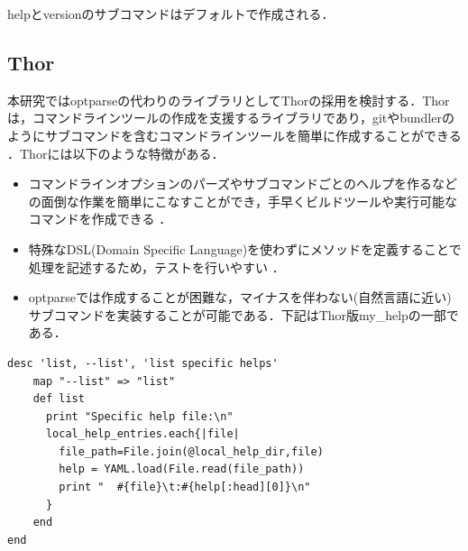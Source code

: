 helpとversionのサブコマンドはデフォルトで作成される．

\subsection{Thor}\label{thor}

本研究ではoptparseの代わりのライブラリとしてThorの採用を検討する．Thorは，コマンドラインツールの作成を支援するライブラリであり，gitやbundlerのようにサブコマンドを含むコマンドラインツールを簡単に作成することができる
\cite{koichiro}．Thorには以下のような特徴がある．

\begin{itemize}
\item コマンドラインオプションのパーズやサブコマンドごとのヘルプを作るなどの面倒な作業を簡単にこなすことができ，手早くビルドツールや実行可能なコマンドを作成できる
\cite{hibariya}．

\item 特殊なDSL(Domain Specific
Language)を使わずにメソッドを定義することで処理を記述するため，テストを行いやすい
\cite{hibariya}．

\item optparseでは作成することが困難な，マイナスを伴わない(自然言語に近い)サブコマンドを実装することが可能である．下記はThor版my\_helpの一部である．
\end{itemize}

\begin{screen}
{\small
\begin{verbatim}
desc 'list, --list', 'list specific helps'
    map "--list" => "list"
    def list
      print "Specific help file:\n"
      local_help_entries.each{|file|
        file_path=File.join(@local_help_dir,file)
        help = YAML.load(File.read(file_path))
        print "  #{file}\t:#{help[:head][0]}\n"
      }
    end
end
\end{verbatim}}
\end{screen}

